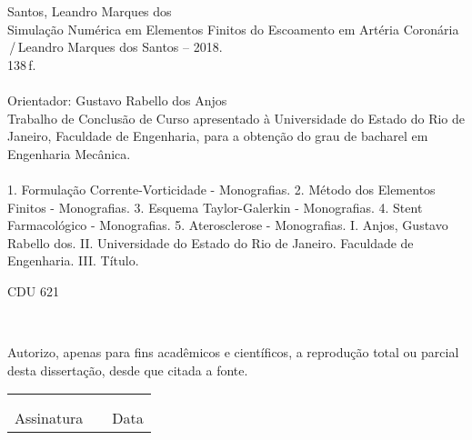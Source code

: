 \begin{titlepage}
\begin{center}
\begin{boxedminipage}{140mm}
{\begin{minipage}[top]{115mm}
		Santos, Leandro Marques dos\\
		\phantom{XX}Simulação Numérica em Elementos Finitos do Escoamento em Artéria Coronária \,/\,Leandro Marques dos Santos -- 2018.\\
		\phantom{XX}138\,f.\\
		\phantom{XX}\\
		\phantom{XX}Orientador: Gustavo Rabello dos Anjos\\
       		\phantom{XX}Trabalho de Conclusão de Curso apresentado à Universidade do Estado do Rio de Janeiro, Faculdade de Engenharia, para a obtenção do grau de bacharel em Engenharia Mecânica.\\
		\phantom{XX}\\
		\phantom{XX}1. Formulação Corrente-Vorticidade - Monografias. 2. Método dos Elementos Finitos - Monografias. 3. Esquema Taylor-Galerkin - Monografias. 4. Stent Farmacológico - Monografias. 5. Aterosclerose - Monografias. I. Anjos, Gustavo Rabello dos. II. Universidade do Estado do Rio de Janeiro. Faculdade de Engenharia. III. Título.
	\end{minipage}}
	\vspace*{5mm}
	\begin{flushright}
	 CDU 621
	\end{flushright}
    \vspace{1mm}
	\end{boxedminipage}\\
	\end{center}
\vspace{1cm}
	Autorizo, apenas para fins acadêmicos e científicos, a reprodução total ou parcial desta dissertação, desde que citada a fonte.\\
	\noindent
	\begin{tabular}{ccc}
	\phantom{XXXXXXXXXXXXXXXXXXXXXXXXXXXXXX}&	 \phantom{XX}	&	\phantom{XXXXXXXXXXXXXXXX}	\\
	\phantom{XXXXXXXXXXXXXXXXXXXXXXXXXXXXXX}&	 \phantom{XX}	&	\phantom{XXXXXXXXXXXXXXXX}	\\
	\cline{1-1}\cline{3-3}
	Assinatura &		&	Data
	\end{tabular}
\end{titlepage} 
